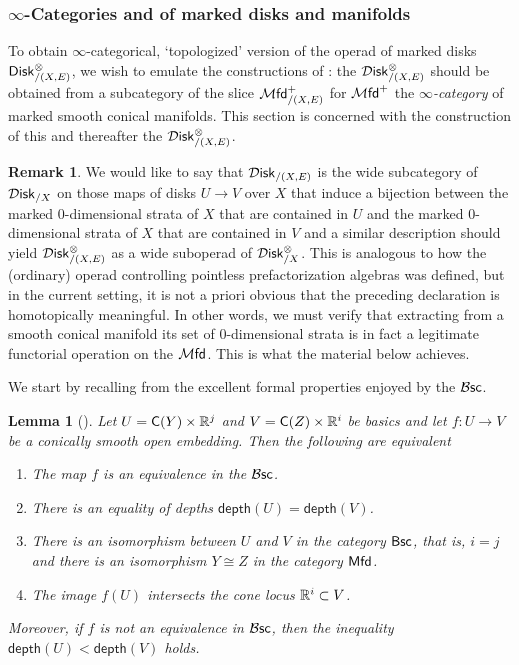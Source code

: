 \documentclass[10pt, reqno, twoside
, final
]{amsart}
\numberwithin{equation}{subsection}%
\theoremstyle{definition}
\theoremstyle{definition}
\theoremstyle{definition}
\theoremstyle{definition}
\theoremstyle{definition}
\theoremstyle{definition}
\theoremstyle{definition}
\theoremstyle{definition}
\theoremstyle{definition}
\theoremstyle{plain}
\theoremstyle{definition}
\theoremstyle{plain}
\theoremstyle{definition}
\theoremstyle{plain}
\theoremstyle{definition}
\newtheorem{rmk}[defn]{Remark}
\theoremstyle{definition}
\theoremstyle{plain}
\newtheorem{lem}[defn]{Lemma}
\theoremstyle{plain}
\theoremstyle{definition}
\theoremstyle{plain}
\theoremstyle{plain}
\theoremstyle{plain}
\begin{document}
\subsubsection{$\infty$-Categories and \infops of marked disks and manifolds}
To obtain $\infty$-categorical, `topologized' version of the operad of marked disks $\mathsf{Disk}^{\otimes}_{/(X,E)}$, we wish to emulate the constructions of \cite{AFT-fh-stratified}: the \infop $\mathcal{D}\mathsf{isk}^{\otimes}_{/(X,E)}$ should be obtained from a subcategory of the slice \infcat $\mathcal{M}\mathsf{fd}^+_{/(X,E)}$ for $\mathcal{M}\mathsf{fd}^+$ the \emph{$\infty$-category} of marked smooth conical manifolds. This section is concerned with the construction of this \infcat and thereafter the \infop $\mathcal{D}\mathsf{isk}^{\otimes}_{/(X,E)}$. 
\begin{rmk}\label{rmk:plessdisknaive}
We would like to say that $\mathcal{D}\mathsf{isk}_{/(X,E)}$ is the wide subcategory of $\mathcal{D}\mathsf{isk}_{/X}$ on those maps of disks $U\rightarrow V$ over $X$ that induce a bijection between the marked 0-dimensional strata of $X$ that are contained in $U$ and the marked 0-dimensional strata of $X$ that are contained in $V$ and a similar description should yield $\mathcal{D}\mathsf{isk}_{/(X,E)}^{\otimes}$ as a wide suboperad of $\mathcal{D}\mathsf{isk}^{\otimes}_{/X}$. This is analogous to how the (ordinary) operad controlling pointless prefactorization algebras was defined, but in the current setting, it is not a priori obvious that the preceding declaration is homotopically meaningful. In other words, we must verify that extracting from a smooth conical manifold its set of 0-dimensional strata is in fact a legitimate functorial operation on the \infcat $\mathcal{M}\mathsf{fd}$. This is what the material below achieves.
\end{rmk}
We start by recalling from \cite{AFT-local-structures} the excellent formal properties enjoyed by the \infcat $\mathcal{B}\mathsf{sc}$.
\begin{lem}[\cite{AFT-local-structures}]\label{lem:bscproperties}
Let $U=\mathsf{C}(Y)\times\mathbb{R}^j$ and $V=\mathsf{C}(Z)\times\mathbb{R}^i$ be basics and let $f:U\rightarrow V$ be a conically smooth open embedding. Then the following are equivalent
\begin{enumerate}[$(1)$]
    \item The map $f$ is an equivalence in the \infcat $\mathcal{B}\mathsf{sc}$.
    \item There is an equality of depths $\mathsf{depth}(U)=\mathsf{depth}(V)$.
    \item There is an isomorphism between $U$ and $V$ in the category $\mathsf{Bsc}$, that is, $i=j$ and there is an isomorphism $Y\cong Z$ in the category $\mathsf{Mfd}$. 
    \item The image $f(U)$ intersects the cone locus $\mathbb{R}^i\subset V$.
\end{enumerate}
Moreover, if $f$ is not an equivalence in $\mathcal{B}\mathsf{sc}$, then the inequality $\mathsf{depth}(U)<\mathsf{depth}(V)$ holds.
\end{lem}
\end{document}
